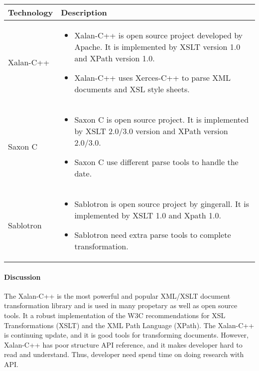 \begin{center}
    \begin{tabular}{ | l | p{10cm} |}
      \hline
      Technology & Description  \\ \hline

      Xalan-C++ \cite{xalan} &
      \begin{itemize}
        \item Xalan-C++ is open source project developed by Apache. It is implemented by XSLT version 1.0 and XPath version 1.0.
        \item Xalan-C++ uses Xerces-C++ to parse XML documents and XSL style sheets.
      \end{itemize}\\ \hline

      Saxon C \cite{Saxon_c} &
      \begin{itemize}
        \item Saxon C is open source project. It is implemented by XSLT 2.0/3.0 version and XPath version 2.0/3.0.
        \item Saxon C use different parse tools to handle the date.
      \end{itemize}\\ \hline

      Sablotron \cite{Sablotron_intro} &
      \begin{itemize}
        \item Sablotron is open source project by gingerall. It is implemented by XSLT 1.0 and Xpath 1.0.
      \item Sablotron need extra parse tools to complete transformation.
      \end{itemize}\\ \hline
    \end{tabular}
\end{center}

\paragraph{Discussion}

The Xalan-C++ is the most powerful and popular XML/XSLT document transformation library and is used in many propetary as well as open source tools.
It a robust implementation of the W3C recommendations for XSL Transformations (XSLT) and the XML Path Language (XPath).
The Xalan-C++ is continuing update, and it is good tools for transforming documents.
However, Xalan-C++ has poor structure API reference, and it makes developer hard to read and understand.
Thus, developer need spend time on doing research with API.


